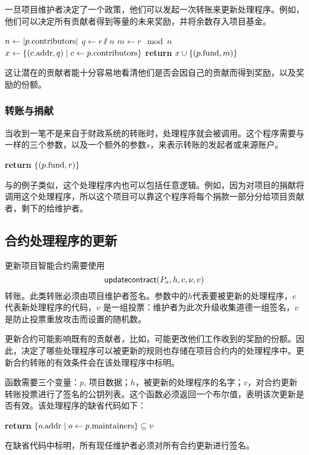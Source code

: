 \noindent 一旦项目维护者决定了一个政策，他们可以发起一次转账来更新处理程序。例如，他们可以决定所有贡献者得到等量的未来奖励，并将余数存入项目基金。

\begin{algorithmic}[0]
        \State $n \gets |p.{\mathrm{contributors}}|$
        \State $q \gets r \sslash n$
        \State $m \gets r \mod n$
        \State $x \gets \{ (c.{\mathrm{addr}}, q) \mid c \gets p.{\mathrm{contributors}} \}$
        \State \textbf{return} $x \cup \{ (p.{\mathrm{fund}}, m) \}$
    \EndProcedure
\end{algorithmic}
这让潜在的贡献者能十分容易地看清他们是否会因自己的贡献而得到奖励，以及奖励的份额。

\subsubsection{转账与捐献}

当收到一笔不是来自于财政系统的\oscoin{}转账时，处理程序就会被调用。这个程序需要与一样的三个参数，以及一个额外的参数$s$，来表示转账的发起者或来源账户。

\medskip
\begin{algorithmic}[0]
        \State \textbf{return} $\{ (p.{\mathrm{fund}}, r) \}$
    \EndProcedure
\end{algorithmic}
与的例子类似，这个处理程序内也可以包括任意逻辑。例如，因为对项目的捐献将调用这个处理程序，所以这个项目可以靠这个程序将每个捐款一部分分给项目贡献者，剩下的给维护者。

\subsection{合约处理程序的更新}

更新项目智能合约需要使用
\[
    \mathsf{updatecontract}\lparen P_a, h, c, \nu, v\rparen
\]
转账。此类转账必须由项目维护者签名。参数中的$h$代表要被更新的处理程序，$c$代表新处理程序的代码，$v$ 是一组投票：维护者为此次升级收集道德一组签名，$v$是防止投票重放攻击而设置的随机数。

更新合约可能影响既有的贡献者，比如，可能更改他们工作收到的奖励的份额。因此，决定了哪些处理程序可以被更新的规则也存储在项目合约内的处理程序中。更新合约转账的有效条件会在该处理程序中标明。

 函数需要三个变量：$p$, 项目数据；$h$，被更新的处理程序的名字；$v$，对合约更新转账投票进行了签名的公钥列表。这个函数必须返回一个布尔值，表明该次更新是否有效。该处理程序的缺省代码如下：
\begin{algorithmic}[0]
        \State \textbf{return} $\{ o.{\mathrm{addr}} \mid o \gets p.{\mathrm{maintainers}} \} \subseteq v$
    \EndProcedure
\end{algorithmic}
在缺省代码中标明，所有现任维护者必须对所有合约更新进行签名。

